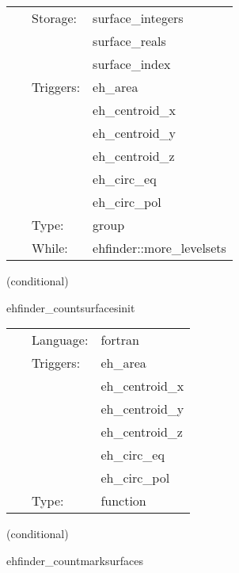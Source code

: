  \begin{tabular*}{160mm}{cll} 
~ & Storage:  & surface\_integers \\ 
~& ~ &surface\_reals\\ 
~& ~ &surface\_index\\ 
~ & Triggers:  & eh\_area \\ 
~& ~ &eh\_centroid\_x\\ 
~& ~ &eh\_centroid\_y\\ 
~& ~ &eh\_centroid\_z\\ 
~& ~ &eh\_circ\_eq\\ 
~& ~ &eh\_circ\_pol\\ 
~ & Type:  & group \\ 
~ & While:  & ehfinder::more\_levelsets \\ 
\end{tabular*} 


\vspace{5mm}

   (conditional) 

\hspace{5mm} ehfinder\_countsurfacesinit 

\hspace{5mm}{\it initialize while loop control } 


\hspace{5mm}

 \begin{tabular*}{160mm}{cll} 
~ & Language:  & fortran \\ 
~ & Triggers:  & eh\_area \\ 
~& ~ &eh\_centroid\_x\\ 
~& ~ &eh\_centroid\_y\\ 
~& ~ &eh\_centroid\_z\\ 
~& ~ &eh\_circ\_eq\\ 
~& ~ &eh\_circ\_pol\\ 
~ & Type:  & function \\ 
\end{tabular*} 


\vspace{5mm}

   (conditional) 

\hspace{5mm} ehfinder\_countmarksurfaces 

\hspace{5mm}{\it counting and mark surfaces } 


\hspace{5mm}


